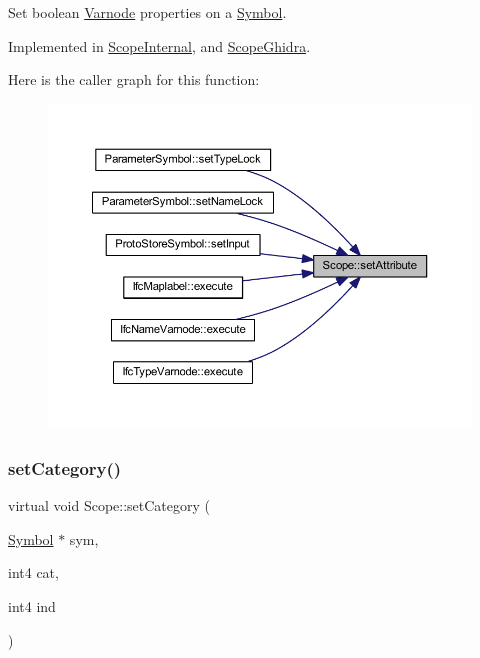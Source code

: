 Set boolean \mbox{\hyperlink{class_varnode}{Varnode}} properties on a \mbox{\hyperlink{class_symbol}{Symbol}}. 



Implemented in \mbox{\hyperlink{class_scope_internal_a320fb817d3062994cb994e38a45fc0e1}{Scope\+Internal}}, and \mbox{\hyperlink{class_scope_ghidra_a8de7736cd5930af6bdcd29b4673ab037}{Scope\+Ghidra}}.

Here is the caller graph for this function\+:
\nopagebreak
\begin{figure}[H]
\begin{center}
\leavevmode
\includegraphics[width=350pt]{class_scope_a7a49f329dcfe47129bf11acac543233e_icgraph}
\end{center}
\end{figure}
\mbox{\label{class_scope_ac807e11df36854d2f7983bdd6779e83a}} 
\subsubsection{\texorpdfstring{setCategory()}{setCategory()}}
{\footnotesize\ttfamily virtual void Scope\+::set\+Category (\begin{DoxyParamCaption}\item[{\mbox{\hyperlink{class_symbol}{Symbol}} $\ast$}]{sym,  }\item[{int4}]{cat,  }\item[{int4}]{ind }\end{DoxyParamCaption})\hspace{0.3cm}{\ttfamily [pure virtual]}}



